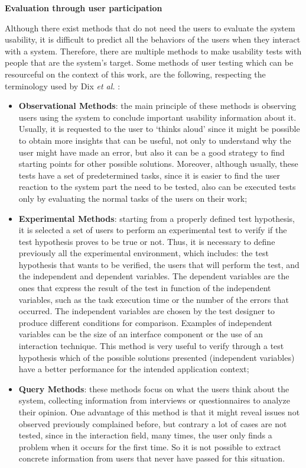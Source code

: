 \bigskip

\textbf{Evaluation through user participation}

Although there exist methods that do not need the users to evaluate the system usability, it is difficult to predict all the behaviors of the users when they interact with a system. Therefore, there are multiple methods to make usability tests with people that are the system's target. Some methods of user testing which can be resourceful on the context of this work, are the following, respecting the terminology used by Dix \textit{et al.} \cite{humanComputerInteraction}:

\begin{itemize}
	\item \textbf{Observational Methods}: the main principle of these methods is observing users using the system to conclude important usability information about it. Usually, it is requested to the user to ‘thinks aloud’ since it might be possible to obtain more insights that can be useful, not only to understand why the user might have made an error, but also it can be a good strategy to find starting points for other possible solutions. Moreover, although usually, these tests have a set of predetermined tasks, since it is easier to find the user reaction to the system part the need to be tested, also can be executed tests only by evaluating the normal tasks of the users on their work;
	\item \textbf{Experimental Methods}: starting from a properly defined test hypothesis, it is selected a set of users to perform an experimental test to verify if the test hypothesis proves to be true or not. Thus, it is necessary to define previously all the experimental environment, which includes: the test hypothesis that wants to be verified, the users that will perform the test,  and the independent and dependent variables. The dependent variables are the ones that express the result of the test in function of the independent variables, such as the task execution time or the number of the errors that occurred. The independent variables are chosen by the test designer to produce different conditions for comparison. Examples of independent variables can be the size of an interface component or the use of an interaction technique. This method is very useful to verify through a test hypothesis which of the possible solutions presented (independent variables) have a better performance for the intended application context;
	\item \textbf{Query Methods}: these methods focus on what the users think about the system, collecting information from interviews or questionnaires to analyze their opinion. One advantage of this method is that it might reveal issues not observed previously complained before, but contrary a lot of cases are not tested, since in the interaction field, many times, the user only finds a problem when it occurs for the first time. So it is not possible to extract concrete information from users that never have passed for this situation.
\end{itemize}

